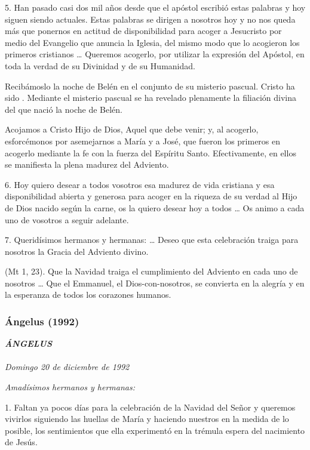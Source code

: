\begin{body}
\begin{body}
5. Han pasado casi dos mil años desde que el apóstol escribió estas palabras y hoy siguen siendo actuales. Estas palabras se dirigen a nosotros hoy y no nos queda más que ponernos en actitud de disponibilidad para acoger a Jesucristo por medio del Evangelio que anuncia la Iglesia, del mismo modo que lo acogieron los primeros cristianos \ldots{} Queremos acogerlo, por utilizar la expresión del Apóstol, en toda la verdad de su Divinidad y de su Humanidad.

Recibámoslo la noche de Belén en el conjunto de su misterio pascual.  Cristo ha sido . Mediante el misterio pascual se ha revelado plenamente la filiación divina del que nació la noche de Belén.

Acojamos a Cristo Hijo de Dios, Aquel que debe venir; y, al acogerlo, esforcémonos por asemejarnos a María y a José, que fueron los primeros en acogerlo mediante la fe con la fuerza del Espíritu Santo. Efectivamente, en ellos se manifiesta la plena madurez del Adviento.

6. Hoy quiero desear a todos vosotros esa madurez de vida cristiana y esa disponibilidad abierta y generosa para acoger en la riqueza de su verdad al Hijo de Dios nacido según la carne, os la quiero desear hoy a todos \ldots{} Os animo a cada uno de vosotros a seguir adelante.

7. Queridísimos hermanos y hermanas:  \ldots{} Deseo que esta celebración traiga para nosotros la Gracia del Adviento divino.

 (Mt 1, 23). Que la Navidad traiga el cumplimiento del Adviento en cada uno de nosotros \ldots{} Que el Emmanuel, el Dios-con-nosotros, se convierta en la alegría y en la esperanza de todos los corazones humanos.

\subsubsection{Ángelus (1992)} \emph{\textbf{ÁNGELUS\\ }\\ Domingo 20 de diciembre de 1992}

\emph{Amadísimos hermanos y hermanas:}

1. Faltan ya pocos días para la celebración de la Navidad del Señor y queremos vivirlos siguiendo las huellas de María y haciendo nuestros en la medida de lo posible, los sentimientos que ella experimentó en la trémula espera del nacimiento de Jesús.


\end{body}
\end{body}
